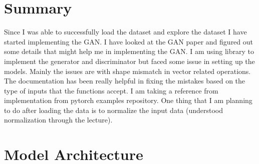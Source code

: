 \documentclass{article}
\begin{document}
\thispagestyle{firstpage}

\section{Summary}
Since I was able to successfully load the dataset and explore the dataset I have started implementing the GAN. I have looked at the GAN paper and figured out some details that might help me in implementing the GAN. I am using  library to implement the generator and discriminator but faced some issue in setting up the models. Mainly the issues are with shape mismatch in vector related operations. The  documentation has been really helpful in fixing the mistakes based on the type of inputs that the functions accept. I am taking a reference from  implementation from pytorch examples repository\cite{1}. One thing that I am planning to do after loading the data is to normalize the input data (understood normalization through the lecture). 

\section{Model Architecture}
\end{document}
